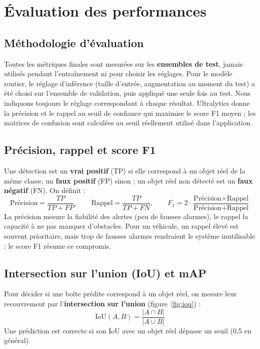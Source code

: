 \section{Évaluation des performances}

\subsection{Méthodologie d'évaluation}
Toutes les métriques finales sont mesurées sur les \textbf{ensembles de test}, jamais utilisés pendant l'entraînement
ni pour choisir les réglages. Pour le modèle routier, le réglage d'inférence (taille d'entrée, augmentation au
moment du test) a été choisi sur l'ensemble de validation, puis appliqué une seule fois au test. Nous indiquons
toujours le réglage correspondant à chaque résultat. Ultralytics donne la précision et le rappel au seuil de
confiance qui maximise le score F1 moyen ; les matrices de confusion sont calculées au seuil réellement utilisé dans
l'application.

\subsection{Précision, rappel et score F1}
Une détection est un \textbf{vrai positif} (TP) si elle correspond à un objet réel de la même classe, un
\textbf{faux positif} (FP) sinon ; un objet réel non détecté est un \textbf{faux négatif} (FN). On définit :
\begin{equation}
  \text{Précision} = \frac{TP}{TP + FP}, \qquad
  \text{Rappel} = \frac{TP}{TP + FN}, \qquad
  F_1 = 2 \cdot \frac{\text{Précision} \times \text{Rappel}}{\text{Précision} + \text{Rappel}}
\end{equation}
La précision mesure la fiabilité des alertes (peu de fausses alarmes), le rappel la capacité à ne pas manquer
d'obstacles. Pour un véhicule, un rappel élevé est souvent prioritaire, mais trop de fausses alarmes rendraient le
système inutilisable : le score F1 résume ce compromis.

\subsection{Intersection sur l'union (IoU) et mAP}
Pour décider si une boîte prédite correspond à un objet réel, on mesure leur recouvrement par l'\textbf{intersection
sur l'union} (figure~\ref{fig:iou}) :
\begin{equation} \text{IoU}(A, B) = \frac{|A \cap B|}{|A \cup B|} \end{equation}
Une prédiction est correcte si son IoU avec un objet réel dépasse un seuil (0,5 en général).

